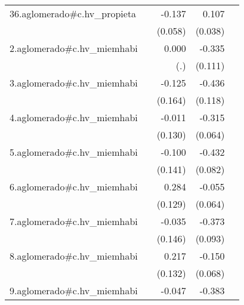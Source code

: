 {\begin{longtable}{l*{4}{D{.}{.}{-1}}}
\addlinespace
36.aglomerado#c.hv\_propieta&                     &      -0.137\sym{*}  &       0.107\sym{**} &                     \\
            &                     &     (0.058)         &     (0.038)         &                     \\
\addlinespace
2.aglomerado#c.hv\_miemhabi&                     &       0.000         &      -0.335\sym{**} &                     \\
            &                     &         (.)         &     (0.111)         &                     \\
\addlinespace
3.aglomerado#c.hv\_miemhabi&                     &      -0.125         &      -0.436\sym{***}&                     \\
            &                     &     (0.164)         &     (0.118)         &                     \\
\addlinespace
4.aglomerado#c.hv\_miemhabi&                     &      -0.011         &      -0.315\sym{***}&                     \\
            &                     &     (0.130)         &     (0.064)         &                     \\
\addlinespace
5.aglomerado#c.hv\_miemhabi&                     &      -0.100         &      -0.432\sym{***}&                     \\
            &                     &     (0.141)         &     (0.082)         &                     \\
\addlinespace
6.aglomerado#c.hv\_miemhabi&                     &       0.284\sym{*}  &      -0.055         &                     \\
            &                     &     (0.129)         &     (0.064)         &                     \\
\addlinespace
7.aglomerado#c.hv\_miemhabi&                     &      -0.035         &      -0.373\sym{***}&                     \\
            &                     &     (0.146)         &     (0.093)         &                     \\
\addlinespace
8.aglomerado#c.hv\_miemhabi&                     &       0.217         &      -0.150\sym{*}  &                     \\
            &                     &     (0.132)         &     (0.068)         &                     \\
\addlinespace
9.aglomerado#c.hv\_miemhabi&                     &      -0.047         &      -0.383\sym{***}&                     \\

\end{longtable}}
